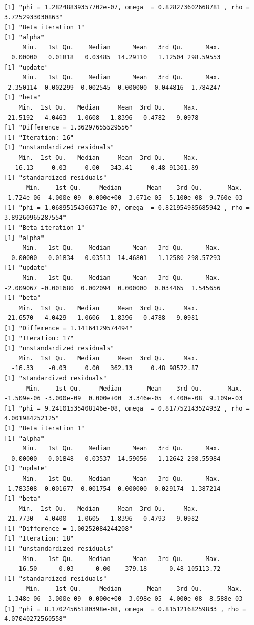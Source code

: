 \documentclass[10pt]{article}
\theoremstyle{definition}
\begin{document}
\begin{itemize}
\begin{verbatim}
[1] "phi = 1.28248839357702e-07, omega  = 0.828273602668781 , rho = 3.7252933030863"
[1] "Beta iteration 1"
[1] "alpha"
     Min.   1st Qu.    Median      Mean   3rd Qu.      Max.
  0.00000   0.01818   0.03485  14.29110   1.12504 298.59553
[1] "update"
     Min.   1st Qu.    Median      Mean   3rd Qu.      Max.
-2.350114 -0.002299  0.002545  0.000000  0.044816  1.784247
[1] "beta"
    Min.  1st Qu.   Median     Mean  3rd Qu.     Max.
-21.5192  -4.0463  -1.0608  -1.8396   0.4782   9.0978
[1] "Difference = 1.36297655529556"
[1] "Iteration: 16"
[1] "unstandardized residuals"
    Min.  1st Qu.   Median     Mean  3rd Qu.     Max.
  -16.13    -0.03     0.00   343.41     0.48 91301.89
[1] "standardized residuals"
      Min.    1st Qu.     Median       Mean    3rd Qu.       Max.
-1.724e-06 -4.000e-09  0.000e+00  3.671e-05  5.100e-08  9.760e-03
[1] "phi = 1.06895154366371e-07, omega  = 0.821954985685942 , rho = 3.89260965287554"
[1] "Beta iteration 1"
[1] "alpha"
     Min.   1st Qu.    Median      Mean   3rd Qu.      Max.
  0.00000   0.01834   0.03513  14.46801   1.12580 298.57293
[1] "update"
     Min.   1st Qu.    Median      Mean   3rd Qu.      Max.
-2.009067 -0.001680  0.002094  0.000000  0.034465  1.545656
[1] "beta"
    Min.  1st Qu.   Median     Mean  3rd Qu.     Max.
-21.6570  -4.0429  -1.0606  -1.8396   0.4788   9.0981
[1] "Difference = 1.14164129574494"
[1] "Iteration: 17"
[1] "unstandardized residuals"
    Min.  1st Qu.   Median     Mean  3rd Qu.     Max.
  -16.33    -0.03     0.00   362.13     0.48 98572.87
[1] "standardized residuals"
      Min.    1st Qu.     Median       Mean    3rd Qu.       Max.
-1.509e-06 -3.000e-09  0.000e+00  3.346e-05  4.400e-08  9.109e-03
[1] "phi = 9.24101535408146e-08, omega  = 0.817752143524932 , rho = 4.001984252125"
[1] "Beta iteration 1"
[1] "alpha"
     Min.   1st Qu.    Median      Mean   3rd Qu.      Max.
  0.00000   0.01848   0.03537  14.59056   1.12642 298.55984
[1] "update"
     Min.   1st Qu.    Median      Mean   3rd Qu.      Max.
-1.783508 -0.001677  0.001754  0.000000  0.029174  1.387214
[1] "beta"
    Min.  1st Qu.   Median     Mean  3rd Qu.     Max.
-21.7730  -4.0400  -1.0605  -1.8396   0.4793   9.0982
[1] "Difference = 1.00252084244208"
[1] "Iteration: 18"
[1] "unstandardized residuals"
     Min.   1st Qu.    Median      Mean   3rd Qu.      Max.
   -16.50     -0.03      0.00    379.18      0.48 105113.72
[1] "standardized residuals"
      Min.    1st Qu.     Median       Mean    3rd Qu.       Max.
-1.348e-06 -3.000e-09  0.000e+00  3.098e-05  4.000e-08  8.588e-03
[1] "phi = 8.17024565180398e-08, omega  = 0.81512168259833 , rho = 4.07040272560558"

\end{verbatim}
\end{itemize}
\end{document}

